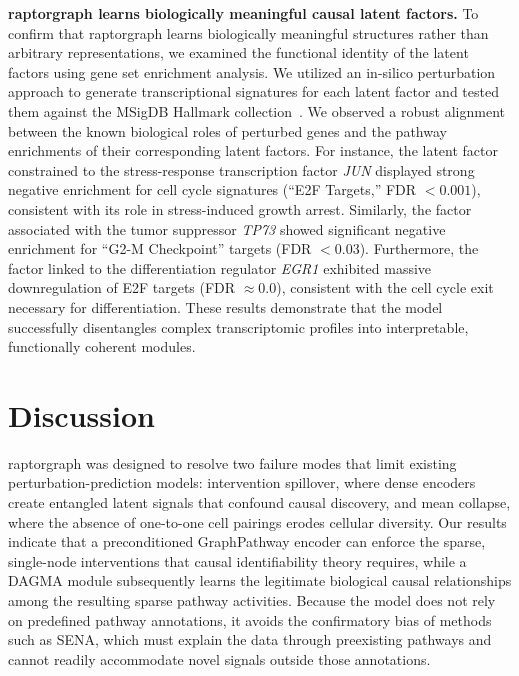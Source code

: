 \documentclass[10pt,letterpaper]{article}
\theoremstyle{definition}
\theoremstyle{remark}
\begin{document}
\textbf{\gls{raptorgraph} learns biologically meaningful causal latent factors.} To confirm that \gls{raptorgraph} learns biologically meaningful structures rather than arbitrary representations, we examined the functional identity of the latent factors using gene set enrichment analysis.
We utilized an in-silico perturbation approach to generate transcriptional signatures for each latent factor and tested them against the MSigDB Hallmark collection~\cite{liberzon_molecular_2015}.
We observed a robust alignment between the known biological roles of perturbed genes and the pathway enrichments of their corresponding latent factors.
For instance, the latent factor constrained to the stress-response transcription factor \textit{JUN} displayed strong negative enrichment for cell cycle signatures (``E2F Targets,'' FDR $< 0.001$), consistent with its role in stress-induced growth arrest.
Similarly, the factor associated with the tumor suppressor \textit{TP73} showed significant negative enrichment for ``G2-M Checkpoint'' targets (FDR $< 0.03$).
Furthermore, the factor linked to the differentiation regulator \textit{EGR1} exhibited massive downregulation of E2F targets (FDR $\approx 0.0$), consistent with the cell cycle exit necessary for differentiation.
These results demonstrate that the model successfully disentangles complex transcriptomic profiles into interpretable, functionally coherent modules.




\section*{Discussion}
\gls{raptorgraph} was designed to resolve two failure modes that limit existing perturbation-prediction models: intervention spillover, where dense encoders create entangled latent signals that confound causal discovery, and mean collapse, where the absence of one-to-one cell pairings erodes cellular diversity.
Our results indicate that a preconditioned GraphPathway encoder can enforce the sparse, single-node interventions that causal identifiability theory requires, while a DAGMA module subsequently learns the legitimate biological causal relationships among the resulting sparse pathway activities.
Because the model does not rely on predefined pathway annotations, it avoids the confirmatory bias of methods such as SENA, which must explain the data through preexisting pathways and cannot readily accommodate novel signals outside those annotations.
\end{document}
